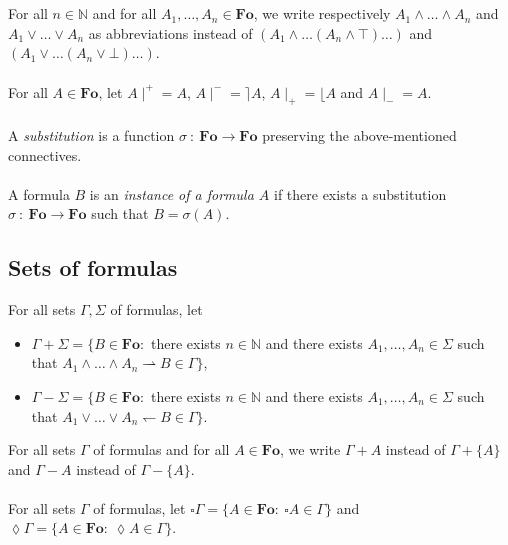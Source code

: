 \documentclass[draft]{article}
\def\N{\mathbb{N}}
\def\Fo{\mathbf{Fo}}
\begin{document}
%
%
\\
\\
%
%
For all $n{\in}\N$ and for all $A_{1},\ldots,A_{n}{\in}\Fo$, we write respectively $A_{1}{\wedge}\ldots{\wedge}A_{n}$ and $A_{1}{\vee}
%
%
%
%
%
%
%
$\linebreak$
%
%
%
%
%
%
\ldots{\vee}A_{n}$ as abbreviations instead of $(A_{1}{\wedge}\ldots(A_{n}{\wedge}{\top})\ldots)$ and $(A_{1}{\vee}\ldots(A_{n}{\vee}{\bot})\ldots)$.
%
%
\\
\\
%
%
For all $A{\in}\Fo$, let $A{\mid}^{+}{=}A$, $A{\mid}^{-}{=}{\rceil}A$, $A{\mid}_{+}{=}{\lfloor}A$ and $A{\mid}_{-}{=}A$.
%
%
\\
\\
%
%
A {\em substitution}\/ is a function $\sigma\ :\ \Fo{\longrightarrow}\Fo$ preserving the above-menti\-oned connectives.
%
%
\\
\\
%
%
A formula $B$ is an {\em instance of a formula $A$}\/ if there exists a substitution $\sigma\ :\ \Fo{\longrightarrow}\Fo$ such that $B{=}\sigma(A)$.
%
%
%
%
\subsection{Sets of formulas}
%
%
For all sets $\Gamma,\Sigma$ of formulas, let
%
%
\begin{itemize}
%
%
\item $\Gamma{+}\Sigma{=}\{B{\in}\Fo:$ there exists $n{\in}\N$ and there exists $A_{1},\ldots,A_{n}{\in}\Sigma$ such that $A_{1}{\wedge}\ldots{\wedge}A_{n}{\rightharpoonup}B{\in}\Gamma\}$,
%
%
\item $\Gamma{-}\Sigma{=}\{B{\in}\Fo:$ there exists $n{\in}\N$ and there exists $A_{1},\ldots,A_{n}{\in}\Sigma$ such that $A_{1}{\vee}\ldots{\vee}A_{n}{\leftharpoondown}B{\in}\Gamma\}$.
%
%
\end{itemize}
%
%
For all sets $\Gamma$ of formulas and for all $A{\in}\Fo$, we write $\Gamma{+}A$ instead of $\Gamma{+}\{A\}$ and $\Gamma{-}A$ instead of $\Gamma{-}\{A\}$.
%
%
\\
\\
%
%
For all sets $\Gamma$ of formulas, let ${\square}\Gamma{=}\{A{\in}\Fo:\ {\square}A{\in}\Gamma\}$ and ${\lozenge}\Gamma{=}\{A{\in}\Fo:\ {\lozenge}A{\in}\Gamma\}$.
%
%
%
%
\end{document}
